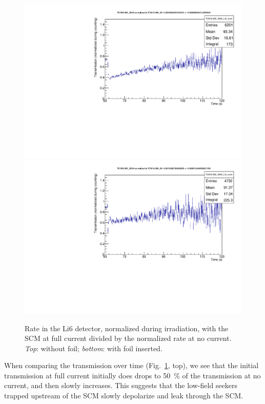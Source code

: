 \documentclass[10pt,letterpaper]{article}
\begin{document}
\begin{figure}
\centering
\includegraphics[width=\textwidth,page=2]{../transmission/TCN18-065_200A_TCN18-065_0A.pdf}
\includegraphics[width=\textwidth,page=2]{../transmission/TCN18-265_200A_TCN18-265_0A.pdf}
\caption{Rate in the Li6 detector, normalized during irradiation, with the SCM at full current divided by the normalized rate at no current. \textit{Top}: without foil; \textit{bottom}: with foil inserted.}
\label{fig:SCMtof}
\end{figure}

When comparing the transmission over time (Fig.~\ref{fig:SCMtof}, top), we see that the initial transmission at full current initially does drops to \SI{50}{\percent} of the transmission at no current, and then slowly increases. This suggests that the low-field seekers trapped upstream of the SCM slowly depolarize and leak through the SCM.
\end{document}
